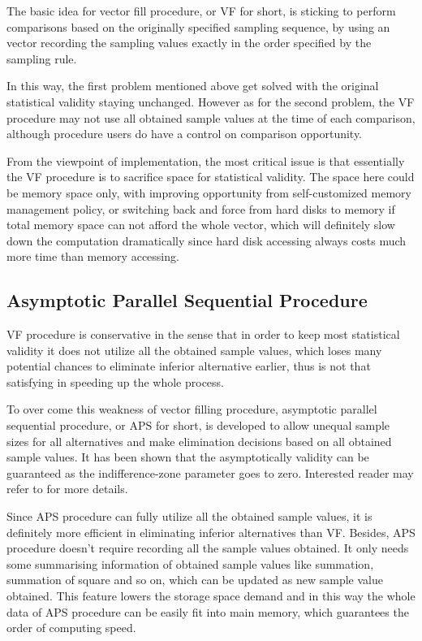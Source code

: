 \documentclass[12pt,a4paper]{report}
\begin{document}
The basic idea for vector fill procedure, or VF for short, is sticking to perform comparisons based on the originally specified sampling sequence, by using an vector recording the sampling values exactly in the order specified by the sampling rule.

In this way, the first problem mentioned above get solved with the original statistical validity staying unchanged. However as for the second problem, the VF procedure may not use all obtained sample values at the time of each comparison, although procedure users do have a control on comparison opportunity.

From the viewpoint of implementation, the most critical issue is that essentially the VF procedure is to sacrifice space for statistical validity. The space here could be memory space only, with improving opportunity from self-customized memory management policy, or switching back and force from hard disks to memory if total memory space can not afford the whole vector, which will definitely slow down the computation dramatically since hard disk accessing always costs much more time than memory accessing.

\subsection{Asymptotic Parallel Sequential Procedure}

VF procedure is conservative in the sense that in order to keep most statistical validity it does not utilize all the obtained sample values, which loses many potential chances to eliminate inferior alternative earlier, thus is not that satisfying in speeding up the whole process.

To over come this weakness of vector filling procedure, asymptotic parallel sequential procedure, or APS for short, is developed to allow unequal sample sizes for all alternatives and make elimination decisions based on all obtained sample values. It has been shown that the asymptotically validity can be guaranteed as the indifference-zone parameter goes to zero. Interested reader may refer to \cite{ras-seq-parallel} for more details.

Since APS procedure can fully utilize all the obtained sample values, it is definitely more efficient in eliminating inferior alternatives than VF. Besides, APS procedure doesn't require recording all the sample values obtained. It only needs some summarising information of obtained sample values like summation, summation of square and so on, which can be updated as new sample value obtained. This feature lowers the storage space demand and in this way the whole data of APS procedure can be easily fit into main memory, which guarantees the order of computing speed.
\end{document}

